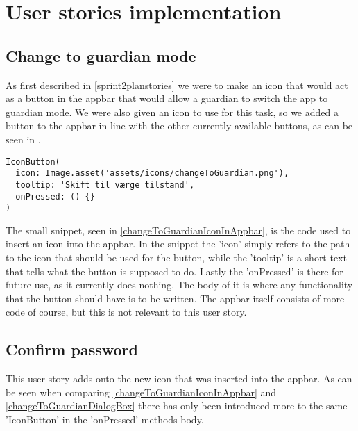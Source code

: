 \section{User stories implementation}

\subsection{Change to guardian mode} \label{changeToGuardianIconImpl}
As first described in \autoref{sprint2planstories} we were to make an icon that would act as a button in the appbar that would allow a guardian to switch the app to guardian mode.
We were also given an icon to use for this task, so we added a button to the appbar in-line with the other currently available buttons, as can be seen in .


\begin{lstlisting}[caption={The code used to insert the change to guardian icon in the appbar}, captionpos=b, label=changeToGuardianIconInAppbar]
IconButton(
  icon: Image.asset('assets/icons/changeToGuardian.png'),
  tooltip: 'Skift til værge tilstand', 
  onPressed: () {}
)
\end{lstlisting}

The small snippet, seen in \autoref{changeToGuardianIconInAppbar}, is the code used to insert an icon into the appbar. 
In the snippet the 'icon' simply refers to the path to the icon that should be used for the button, while the 'tooltip' is a short text that tells what the button is supposed to do. 
Lastly the 'onPressed' is there for future use, as it currently does nothing. 
The body of it is where any functionality that the button should have is to be written.
The appbar itself consists of more code of course, but this is not relevant to this user story.

\subsection{Confirm password} \label{changeToGuardianDialogBoxImpl}
This user story adds onto the new icon that was inserted into the appbar. 
As can be seen when comparing \autoref{changeToGuardianIconInAppbar} and \autoref{changeToGuardianDialogBox} there has only been introduced more to the same 'IconButton' in the 'onPressed' methods body.

